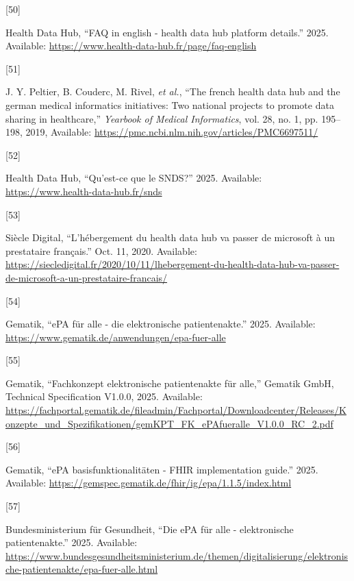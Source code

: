 \documentclass[
  a4paper,
  a4paper,
  11pt]{ltjsbook}
\newlength{\cslhangindent}
\newlength{\csllabelwidth}
\newenvironment{CSLReferences}[2] %
 {\begin{list}{}{%
  \setlength{\itemindent}{0pt}
  \setlength{\leftmargin}{0pt}
  \setlength{\parsep}{0pt}
  \ifodd #1
   \setlength{\leftmargin}{\cslhangindent}
   \setlength{\itemindent}{-1\cslhangindent}
  \fi
  \setlength{\itemsep}{#2\baselineskip}}}
 {\end{list}}
\newcommand{\CSLLeftMargin}[1]{\parbox[t]{\csllabelwidth}{\strut#1\strut}}
\newcommand{\CSLRightInline}[1]{\parbox[t]{\linewidth - \csllabelwidth}{\strut#1\strut}}
\begin{document}
\begin{CSLReferences}{0}{0}
\CSLLeftMargin{{[}50{]} }%
\CSLRightInline{Health Data Hub, {``FAQ in english - health data hub
platform details.''} 2025. Available:
\url{https://www.health-data-hub.fr/page/faq-english}}

\CSLLeftMargin{{[}51{]} }%
\CSLRightInline{J. Y. Peltier, B. Couderc, M. Rivel, \emph{et al.},
{``The french health data hub and the german medical informatics
initiatives: Two national projects to promote data sharing in
healthcare,''} \emph{Yearbook of Medical Informatics}, vol. 28, no. 1,
pp. 195--198, 2019, Available:
\url{https://pmc.ncbi.nlm.nih.gov/articles/PMC6697511/}}

\CSLLeftMargin{{[}52{]} }%
\CSLRightInline{Health Data Hub, {``Qu'est-ce que le SNDS?''} 2025.
Available: \url{https://www.health-data-hub.fr/snds}}

\CSLLeftMargin{{[}53{]} }%
\CSLRightInline{Siècle Digital, {``L'hébergement du health data hub va
passer de microsoft à un prestataire français.''} Oct. 11, 2020.
Available:
\url{https://siecledigital.fr/2020/10/11/lhebergement-du-health-data-hub-va-passer-de-microsoft-a-un-prestataire-francais/}}

\CSLLeftMargin{{[}54{]} }%
\CSLRightInline{Gematik, {``ePA für alle - die elektronische
patientenakte.''} 2025. Available:
\url{https://www.gematik.de/anwendungen/epa-fuer-alle}}

\CSLLeftMargin{{[}55{]} }%
\CSLRightInline{Gematik, {``Fachkonzept elektronische patientenakte für
alle,''} Gematik GmbH, Technical Specification V1.0.0, 2025. Available:
\url{https://fachportal.gematik.de/fileadmin/Fachportal/Downloadcenter/Releases/Konzepte_und_Spezifikationen/gemKPT_FK_ePAfueralle_V1.0.0_RC_2.pdf}}

\CSLLeftMargin{{[}56{]} }%
\CSLRightInline{Gematik, {``ePA basisfunktionalitäten - FHIR
implementation guide.''} 2025. Available:
\url{https://gemspec.gematik.de/fhir/ig/epa/1.1.5/index.html}}

\CSLLeftMargin{{[}57{]} }%
\CSLRightInline{Bundesministerium für Gesundheit, {``Die ePA für alle -
elektronische patientenakte.''} 2025. Available:
\url{https://www.bundesgesundheitsministerium.de/themen/digitalisierung/elektronische-patientenakte/epa-fuer-alle.html}}


\end{CSLReferences}
\end{document}
